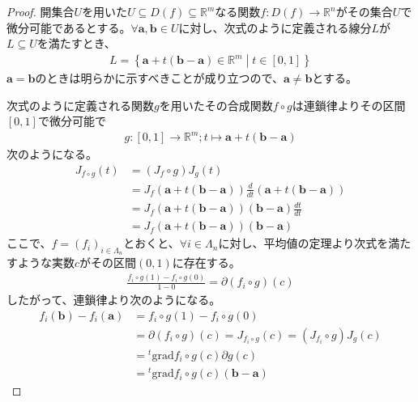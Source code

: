 \documentclass[dvipdfmx]{jsarticle}
\begin{document}
\begin{proof}
開集合$U$を用いた$U \subseteq D(f) \subseteq \mathbb{R}^{m}$なる関数$f:D(f) \rightarrow \mathbb{R}^{n}$がその集合$U$で微分可能であるとする。$\forall\mathbf{a},\mathbf{b} \in U$に対し、次式のように定義される線分$L$が$L \subseteq U$を満たすとき、
\begin{align*}
L = \left\{ \mathbf{a} + t\left( \mathbf{b} - \mathbf{a} \right) \in \mathbb{R}^{m} \middle| t \in [ 0,1] \right\}
\end{align*}
$\mathbf{a} = \mathbf{b}$のときは明らかに示すべきことが成り立つので、$\mathbf{a} \neq \mathbf{b}$とする。\par
次式のように定義される関数$g$を用いたその合成関数$f \circ g$は連鎖律よりその区間$[ 0,1]$で微分可能で
\begin{align*}
g:[ 0,1] \rightarrow \mathbb{R}^{m};t \mapsto \mathbf{a} + t\left( \mathbf{b} - \mathbf{a} \right)
\end{align*}
次のようになる。
\begin{align*}
J_{f \circ g}(t) &= \left( J_{f} \circ g \right)J_{g}(t)\\
&= J_{f}\left( \mathbf{a} + t\left( \mathbf{b} - \mathbf{a} \right) \right)\frac{d}{dt}\left( \mathbf{a} + t\left( \mathbf{b} - \mathbf{a} \right) \right)\\
&= J_{f}\left( \mathbf{a} + t\left( \mathbf{b} - \mathbf{a} \right) \right)\left( \mathbf{b} - \mathbf{a} \right)\frac{dt}{dt}\\
&= J_{f}\left( \mathbf{a} + t\left( \mathbf{b} - \mathbf{a} \right) \right)\left( \mathbf{b} - \mathbf{a} \right)
\end{align*}
ここで、$f = \left( f_{i} \right)_{i \in \varLambda_{n}}$とおくと、$\forall i \in \varLambda_{n}$に対し、平均値の定理より次式を満たすような実数$c$がその区間$(0,1)$に存在する。
\begin{align*}
\frac{f_{i} \circ g(1) - f_{i} \circ g(0)}{1 - 0} = \partial\left( f_{i} \circ g \right)(c)
\end{align*}
したがって、連鎖律より次のようになる。
\begin{align*}
f_{i}\left( \mathbf{b} \right) - f_{i}\left( \mathbf{a} \right) &= f_{i} \circ g(1) - f_{i} \circ g(0)\\
&= \partial\left( f_{i} \circ g \right)(c) = J_{f_{i} \circ g}(c) = \left( J_{f_{i}} \circ g \right)J_{g}(c)\\
&={}^{t}\mathrm{grad}f_{i} \circ g(c)\partial g(c)\\
&={}^{t}\mathrm{grad}f_{i} \circ g(c)\left( \mathbf{b} - \mathbf{a} \right)

\end{align*}
\end{proof}
\end{document}
